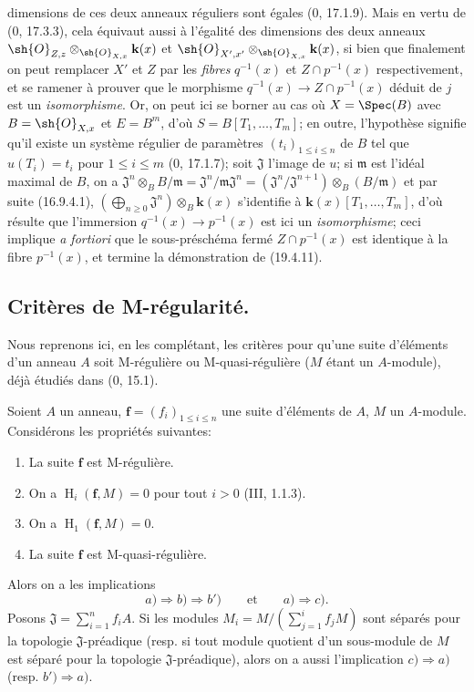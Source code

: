 dimensions de ces deux anneaux réguliers sont égales ($0$, 17.1.9). Mais en vertu de ($0$, 17.3.3), cela équivaut aussi à l'égalité des dimensions des deux anneaux $\sh{O}_{Z,z}\otimes_{\sh{O}_{X,x}}\mathbf k(x)$ et $\sh{O}_{X',x'}\otimes_{\sh{O}_{X,x}}\mathbf k(x)$, si bien que finalement on peut remplacer $X'$ et $Z$ par les \emph{fibres} $q^{-1}(x)$ et $Z\cap p^{-1}(x)$ respectivement, et se ramener à prouver que le morphisme $q^{-1}(x)\to Z\cap p^{-1}(x)$ déduit de $j$ est un \emph{isomorphisme}. Or, on peut ici se borner au cas où $X=\Spec(B)$ avec $B=\sh{O}_{X,x}$ et $E=B^m$, d'où $S=B[T_1,\ldots,T_m]$; en outre, l'hypothèse signifie qu'il existe un système régulier de paramètres $(t_i)_{1\leq i\leq n}$ de $B$ tel que $u(T_i)=t_i$ pour $1\leq i\leq m$ ($0$, 17.1.7); soit $\mathfrak J$ l'image de $u$; si $\mathfrak m$ est l'idéal maximal de $B$, on a $\mathfrak J^n\otimes_B B/\mathfrak m=\mathfrak J^n/\mathfrak m\mathfrak J^n=(\mathfrak J^n/\mathfrak J^{n+1})\otimes_B(B/\mathfrak m)$ et par suite (16.9.4.1), $(\bigoplus_{n\geq0}\mathfrak J^n)\otimes_B\mathbf k(x)$ s'identifie à $\mathbf k(x)[T_1,\ldots,T_m]$, d'où résulte que l'immersion $q^{-1}(x)\to p^{-1}(x)$ est ici un \emph{isomorphisme}; ceci implique \emph{a fortiori} que le sous-préschéma fermé $Z\cap p^{-1}(x)$ est identique à la fibre $p^{-1}(x)$, et termine la démonstration de (19.4.11).

\subsection{Critères de M-régularité.}

Nous reprenons ici, en les complétant, les critères pour qu'une suite d'éléments d'un anneau $A$ soit M-régulière ou M-quasi-régulière ($M$ étant un $A$-module), déjà étudiés dans ($0$, 15.1).

\begin{theorem}[19.5.1]
\label{IV.19.5.1}
Soient $A$ un anneau, $\mathbf f=(f_i)_{1\leq i\leq n}$ une suite d'éléments de $A$, $M$ un $A$-module. Considérons les propriétés suivantes:
\begin{enumerate}
  \item[a)] La suite $\mathbf f$ est M-régulière.
  \item[b)] On a $\operatorname{H}_i(\mathbf f,M)=0$ pour tout $i>0$ (III, 1.1.3).
  \item[b$'$)] On a $\operatorname{H}_1(\mathbf f,M)=0$.
  \item[c)] La suite $\mathbf f$ est M-quasi-régulière.
\end{enumerate}
Alors on a les implications
\[
  a)\Rightarrow b)\Rightarrow b')\qquad\text{et}\qquad a)\Rightarrow c).
\]
Posons $\mathfrak J=\sum_{i=1}^n f_iA$. Si les modules $M_i=M/(\sum_{j=1}^i f_jM)$ sont séparés pour la topologie $\mathfrak J$-préadique (resp. si tout module quotient d'un sous-module de $M$ est séparé pour la topologie $\mathfrak J$-préadique), alors on a aussi l'implication $c)\Rightarrow a)$ (resp. $b')\Rightarrow a)$.
\end{theorem}

